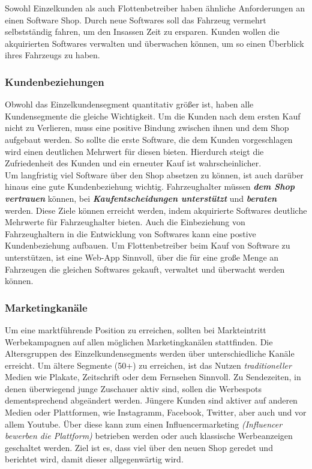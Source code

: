 Sowohl Einzelkunden als auch Flottenbetreiber haben ähnliche Anforderungen an einen Software Shop. Durch neue Softwares soll das Fahrzeug vermehrt selbstständig fahren, um den Insassen Zeit zu ersparen. Kunden wollen die akquirierten Softwares verwalten und überwachen können, um so einen Überblick ihres Fahrzeugs zu haben.

\subsubsection{Kundenbeziehungen}
Obwohl das Einzelkundensegment quantitativ größer ist, haben alle Kundensegmente die gleiche Wichtigkeit. Um die Kunden nach dem ersten Kauf nicht zu Verlieren, muss eine positive Bindung zwischen ihnen und dem Shop aufgebaut werden. So sollte die erste Software, die dem Kunden vorgeschlagen wird einen deutlichen Mehrwert für diesen bieten. Hierdurch steigt die Zufriedenheit des Kunden und ein erneuter Kauf ist wahrscheinlicher.\\
Um langfristig viel Software über den Shop absetzen zu können, ist auch darüber hinaus eine gute Kundenbeziehung wichtig. Fahrzeughalter müssen \textit{\textbf{dem Shop vertrauen}} können, bei \textit{\textbf{Kaufentscheidungen unterstützt}} und \textbf{\textit{beraten}} werden. Diese Ziele können erreicht werden, indem akquirierte Softwares deutliche Mehrwerte für Fahrzeughalter bieten. Auch die Einbeziehung von Fahrzeughaltern in die Entwicklung von Softwares kann eine postive Kundenbeziehung aufbauen. Um Flottenbetreiber beim Kauf von Software zu unterstützen, ist eine Web-App Sinnvoll, über die für eine große Menge an Fahrzeugen die gleichen Softwares gekauft, verwaltet und überwacht werden können.

\subsubsection{Marketingkanäle}
Um eine marktführende Position zu erreichen, sollten bei Markteintritt Werbekampagnen auf allen möglichen Marketingkanälen stattfinden. Die Altersgruppen des Einzelkundensegments werden über unterschiedliche Kanäle erreicht. Um ältere Segmente (50+) zu erreichen, ist das Nutzen \textit{traditioneller} Medien wie Plakate, Zeitschrift oder dem Fernsehen Sinnvoll. Zu Sendezeiten, in denen überwiegend junge Zuschauer aktiv sind, sollen die Werbespots dementsprechend abgeändert werden. Jüngere Kunden sind aktiver auf anderen Medien oder Plattformen, wie Instagramm, Facebook, Twitter, aber auch und vor allem Youtube. Über diese kann zum einen Influencermarketing \textit{(Influencer bewerben die Plattform)} betrieben werden oder auch klassische Werbeanzeigen geschaltet werden. Ziel ist es, dass viel über den neuen Shop geredet und berichtet wird, damit dieser allgegenwärtig wird.

